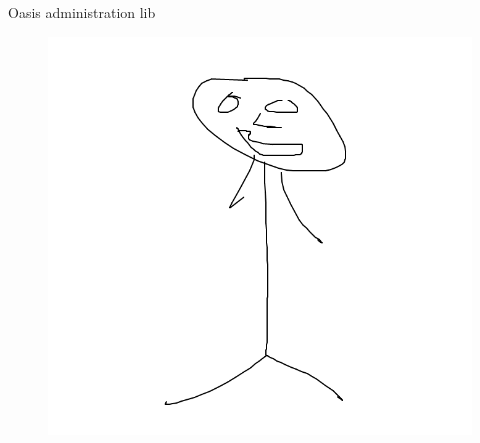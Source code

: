 \thispagestyle{empty}


\begin{center}
\Huge{Oasis administration lib}
\newline
\newline
\end{center}

\begin{figure}[!h]
\begin{center}
\includegraphics[scale=0.6]{Images/frontpage_pic.png}
\end{center}
\end{figure}
